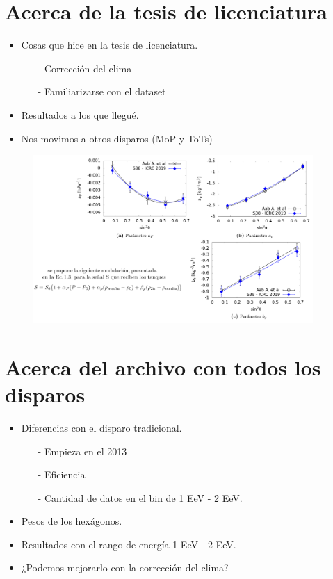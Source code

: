 \section{Acerca de la tesis de licenciatura}


  \begin{itemize}
    \item Cosas que hice en la tesis de licenciatura.
    \begin{itemize}
    	\item[-] Corrección del clima
    	\item[-] Familiarizarse con el dataset
    \end{itemize}
    \item Resultados a los que llegué.
    \item Nos movimos a otros disparos (MoP y ToTs)
  \end{itemize}
  
   
  \begin{figure}[htbp]
    \centering
    \includegraphics[width=0.95\textwidth]{../beamer-07-05-2020/tesis.png}
  \end{figure}
  
\section{Acerca del archivo con todos los disparos}

  \begin{itemize}
  	\item Diferencias con el disparo tradicional.
    \begin{itemize}
      \item[-] Empieza en el 2013
      \item[-] Eficiencia
      \item[-] Cantidad de datos en el bin de 1 EeV - 2 EeV.
    \end{itemize}
  	\item Pesos de los hexágonos.
  	\item Resultados con el rango de energía 1 EeV - 2 EeV.
    \item ¿Podemos mejorarlo con la corrección del clima?
  \end{itemize}

